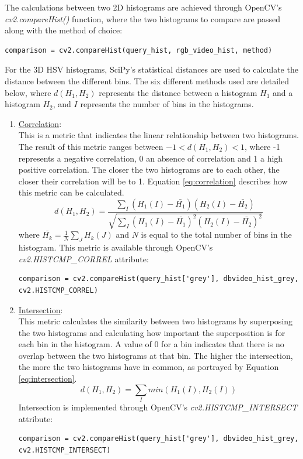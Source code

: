 The calculations between two 2D histograms are achieved through OpenCV's \textit{cv2.compareHist()} function, where the two histograms to compare are passed along with the method of choice:

\begin{lstlisting}
comparison = cv2.compareHist(query_hist, rgb_video_hist, method)
\end{lstlisting}

For the 3D HSV histograms, SciPy's statistical distances are used to calculate the distance between the different bins. The six different methods used are detailed below, where $d(H_1, H_2)$ represents the distance between a histogram $H_1$ and a histogram $H_2$, and $I$ represents the number of bins in the histograms.

\begin{enumerate}

    \item \underline{Correlation}:\\
    This is a metric that indicates the linear relationship between two histograms. The result of this metric ranges between $-1 < d(H_1,H_2) < 1$, where -1 represents a negative correlation, 0 an absence of correlation and 1 a high positive correlation. The closer the two histograms are to each other, the closer their correlation will be to 1. Equation \ref{eq:correlation} describes how this metric can be calculated.
    \begin{equation}
    \label{eq:correlation}
        d(H_1,H_2)=\frac{\sum _I(H_1(I)-\bar{H_1})(H_2(I)-\bar{H_2})}{\sqrt{\sum _I(H_1(I)-\bar{H_1})^2(H_2(I)-\bar{H_2})^2}}
    \end{equation}
    where $\bar{H_k}=\frac{1}{N}\sum_JH_k(J)$ and $N$ is equal to the total number of bins in the histogram. This metric is available through OpenCV's \textit{cv2.HISTCMP\_CORREL} attribute:
\begin{lstlisting}
comparison = cv2.compareHist(query_hist['grey'], dbvideo_hist_grey, cv2.HISTCMP_CORREL)
\end{lstlisting}

    \item \underline{Intersection}:\\
    This metric calculates the similarity between two histograms by superposing the two histograms and calculating how important the superposition is for each bin in the histogram. A value of 0 for a bin indicates that there is no overlap between the two histograms at that bin. The higher the intersection, the more the two histograms have in common, as portrayed by Equation \ref{eq:intersection}.
    \begin{equation}
    \label{eq:intersection}
        d(H_1,H_2)=\sum_Imin(H_1(I),H_2(I))
    \end{equation}
    Intersection is implemented through OpenCV's \textit{cv2.HISTCMP\_INTERSECT} attribute:
\begin{lstlisting}
comparison = cv2.compareHist(query_hist['grey'], dbvideo_hist_grey, cv2.HISTCMP_INTERSECT)
\end{lstlisting}


\end{enumerate}
